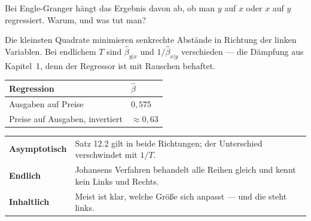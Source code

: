 \begin{aufgabe}
Bei Engle-Granger hängt das Ergebnis davon ab, ob man $y$ auf $x$ oder $x$ auf $y$ regressiert. Warum, und was tut man?

\loesung
{}
Die kleinsten Quadrate minimieren senkrechte Abstände in Richtung der linken Variablen. Bei endlichem $T$ sind $\hat\beta_{y|x}$ und $1/\hat\beta_{x|y}$ verschieden --- die Dämpfung aus Kapitel~1, denn der Regressor ist mit Rauschen behaftet.

\begin{center}
{\small
\renewcommand{\arraystretch}{1.48}
\begin{tabular}{@{}P{3.0cm}P{2.4cm}@{}}
\toprule
\textbf{Regression} & $\hat\beta$\\
\midrule
Ausgaben auf Preise & $0{,}575$\\
Preise auf Ausgaben, invertiert & $\approx 0{,}63$\\
\bottomrule
\end{tabular}}
\end{center}

\begin{center}
{\small
\renewcommand{\arraystretch}{1.5}
\begin{tabular}{@{}P{2.8cm}P{5.8cm}@{}}
\toprule
\textbf{Asymptotisch} & Satz 12.2 gilt in beide Richtungen; der Unterschied verschwindet mit $1/T$.\\
\textbf{Endlich} & Johansens Verfahren behandelt alle Reihen gleich und kennt kein Links und Rechts.\\
\textbf{Inhaltlich} & Meist ist klar, welche Größe sich anpasst --- und die steht links.\\
\bottomrule
\end{tabular}}
\end{center}

\begin{center}
\begin{minipage}{0.88\textwidth}
\end{minipage}
\end{center}
\end{aufgabe}

